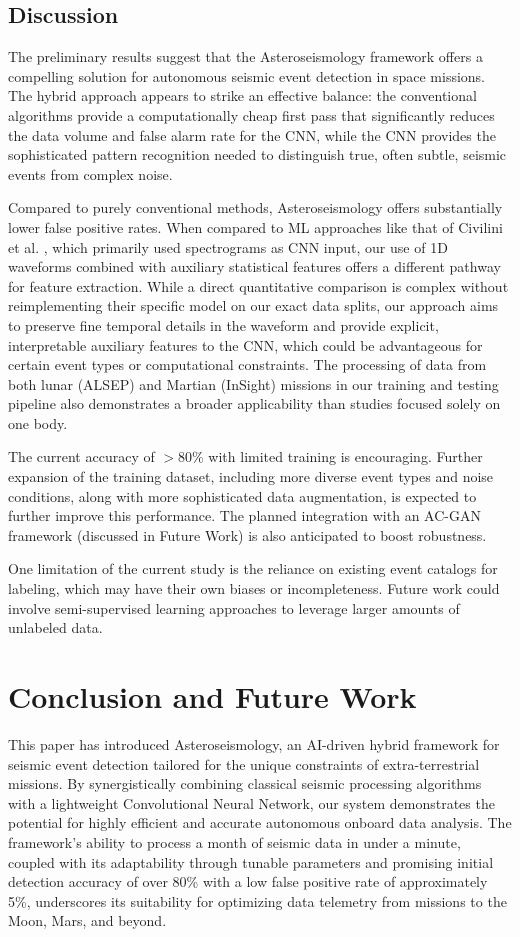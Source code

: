 \documentclass[conference]{IEEEtran}
\begin{document}
\subsection{Discussion}
The preliminary results suggest that the Asteroseismology framework offers a compelling solution for autonomous seismic event detection in space missions. The hybrid approach appears to strike an effective balance: the conventional algorithms provide a computationally cheap first pass that significantly reduces the data volume and false alarm rate for the CNN, while the CNN provides the sophisticated pattern recognition needed to distinguish true, often subtle, seismic events from complex noise.

Compared to purely conventional methods, Asteroseismology offers substantially lower false positive rates. When compared to ML approaches like that of Civilini et al. \cite{favPaper}, which primarily used spectrograms as CNN input, our use of 1D waveforms combined with auxiliary statistical features offers a different pathway for feature extraction. While a direct quantitative comparison is complex without reimplementing their specific model on our exact data splits, our approach aims to preserve fine temporal details in the waveform and provide explicit, interpretable auxiliary features to the CNN, which could be advantageous for certain event types or computational constraints. The processing of data from both lunar (ALSEP) and Martian (InSight) missions in our training and testing pipeline also demonstrates a broader applicability than studies focused solely on one body.

The current accuracy of $>$80\% with limited training is encouraging. Further expansion of the training dataset, including more diverse event types and noise conditions, along with more sophisticated data augmentation, is expected to further improve this performance. The planned integration with an AC-GAN framework (discussed in Future Work) is also anticipated to boost robustness.

One limitation of the current study is the reliance on existing event catalogs for labeling, which may have their own biases or incompleteness. Future work could involve semi-supervised learning approaches to leverage larger amounts of unlabeled data.

\section{Conclusion and Future Work}
\label{sec:conclusion}
This paper has introduced Asteroseismology, an AI-driven hybrid framework for seismic event detection tailored for the unique constraints of extra-terrestrial missions. By synergistically combining classical seismic processing algorithms with a lightweight Convolutional Neural Network, our system demonstrates the potential for highly efficient and accurate autonomous onboard data analysis. The framework's ability to process a month of seismic data in under a minute, coupled with its adaptability through tunable parameters and promising initial detection accuracy of over 80\% with a low false positive rate of approximately 5\%, underscores its suitability for optimizing data telemetry from missions to the Moon, Mars, and beyond.
\end{document}
